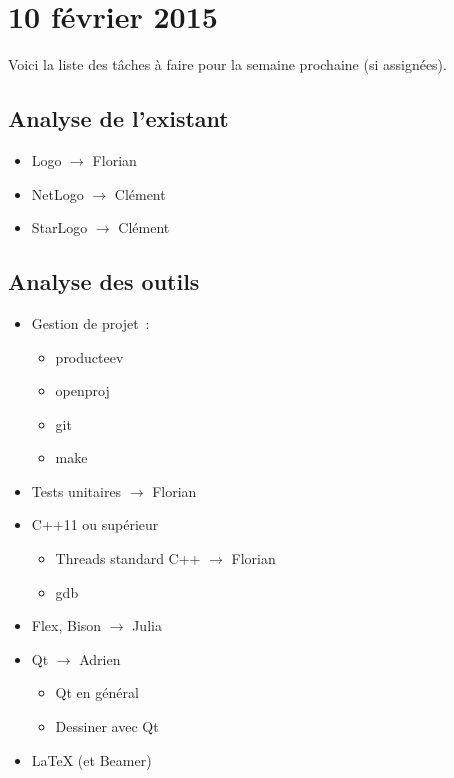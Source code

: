 \section{10 février 2015}

Voici la liste des tâches à faire pour la semaine prochaine (si assignées).

\subsection{Analyse de l'existant}
\begin{itemize}
	\item Logo $\rightarrow$ Florian
	\item NetLogo $\rightarrow$ Clément
	\item StarLogo $\rightarrow$ Clément
\end{itemize}

\subsection{Analyse des outils}
\begin{itemize}
	\item Gestion de projet~:
	\begin{itemize}
		\item producteev
		\item openproj
		\item git
		\item make
	\end{itemize}
	\item Tests unitaires $\rightarrow$ Florian
	\item C++11 ou supérieur
	\begin{itemize}
		\item Threads standard C++ $\rightarrow$ Florian
		\item gdb
	\end{itemize}
	\item Flex, Bison $\rightarrow$ Julia
	\item Qt $\rightarrow$ Adrien
	\begin{itemize}
		\item Qt en général
		\item Dessiner avec Qt
	\end{itemize}
	\item LaTeX (et Beamer)
\end{itemize}

